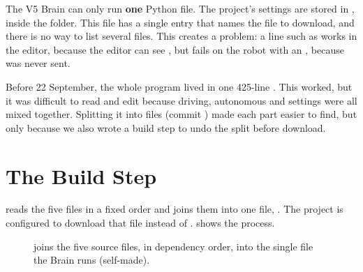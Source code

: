 The V5 Brain can only run \textbf{one} Python file. The project's settings are
stored in , inside the  folder.
This file has a single  entry that names the file to download, and
there is no way to list several files. This
creates a problem: a line such as  works in the
editor, because the editor can see , but fails on the robot with
an , because  was never sent.

Before 22 September, the whole program lived in one 425-line .
This worked, but it was difficult to read and edit because driving, autonomous
and settings were all mixed together. Splitting it into files (commit
) made each part easier to find, but only because we also wrote
a build step to undo the split before download.

\section{The Build Step}
\label{sec:build}

 reads the five files in a fixed order and joins them into one
file, . The project is configured to download that file
instead of .  shows the process.

\begin{figure}[h]
  \centering
  \caption{ joins the five source files, in dependency order, into the single file the Brain runs (self-made).}
  \label{fig:build}
\end{figure}


